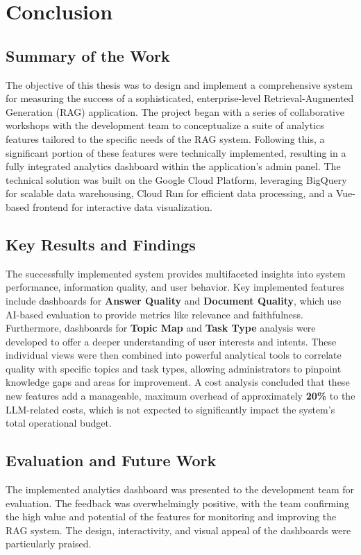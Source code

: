 \documentclass[
	english,
	ruledheaders=section,%
	class=report,%
	thesis={type=bachelor},%
	accentcolor=1b,%
	custommargins=true,%
	marginpar=false,%
	parskip=half-,%
	fontsize=11pt,%
	DIV=14,
]{tudapub}
\begin{document}
\chapter{Conclusion}
\section{Summary of the Work}
The objective of this thesis was to design and implement a comprehensive system for measuring the success of a sophisticated, enterprise-level Retrieval-Augmented Generation (RAG) application. The project began with a series of collaborative workshops with the development team to conceptualize a suite of analytics features tailored to the specific needs of the RAG system. Following this, a significant portion of these features were technically implemented, resulting in a fully integrated analytics dashboard within the application's admin panel. The technical solution was built on the Google Cloud Platform, leveraging BigQuery for scalable data warehousing, Cloud Run for efficient data processing, and a Vue-based frontend for interactive data visualization.

\section{Key Results and Findings}
The successfully implemented system provides multifaceted insights into system performance, information quality, and user behavior. Key implemented features include dashboards for \textbf{Answer Quality} and \textbf{Document Quality}, which use AI-based evaluation to provide metrics like relevance and faithfulness. Furthermore, dashboards for \textbf{Topic Map} and \textbf{Task Type} analysis were developed to offer a deeper understanding of user interests and intents. These individual views were then combined into powerful analytical tools to correlate quality with specific topics and task types, allowing administrators to pinpoint knowledge gaps and areas for improvement. A cost analysis concluded that these new features add a manageable, maximum overhead of approximately \textbf{20\%} to the LLM-related costs, which is not expected to significantly impact the system's total operational budget.

\section{Evaluation and Future Work}
The implemented analytics dashboard was presented to the development team for evaluation. The feedback was overwhelmingly positive, with the team confirming the high value and potential of the features for monitoring and improving the RAG system. The design, interactivity, and visual appeal of the dashboards were particularly praised.
\end{document}
